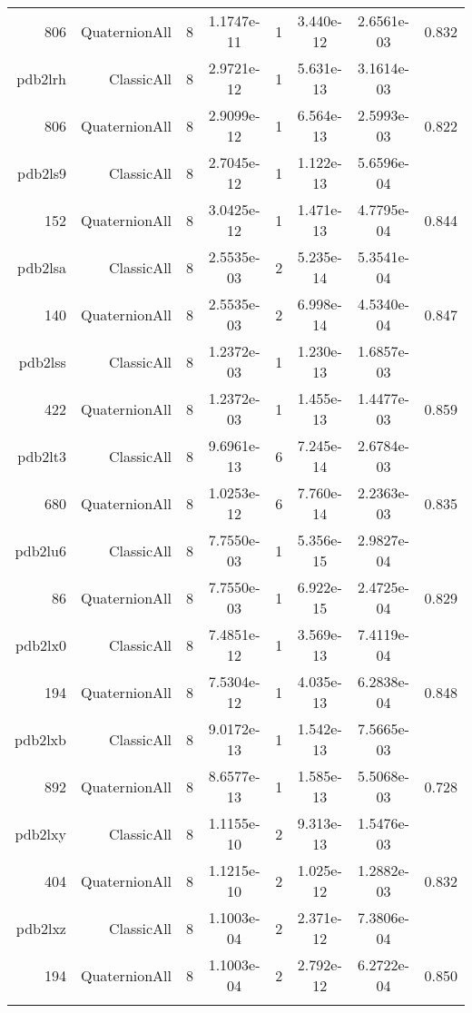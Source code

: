 \begin{xltabular}{\textwidth}{r|rcS[table-format=1.4e+2]cS[table-format=1.3e+2]S[table-format=1.4e+2]S[table-format=-1.3]}
806 & QuaternionAll & 8 & 1.1747e-11 & 1 & 3.440e-12 & 2.6561e-03 & 0.832\\  \addlinespace
pdb2lrh & ClassicAll & 8 & 2.9721e-12 & 1 & 5.631e-13 & 3.1614e-03 & \\
806 & QuaternionAll & 8 & 2.9099e-12 & 1 & 6.564e-13 & 2.5993e-03 & 0.822\\  \addlinespace
pdb2ls9 & ClassicAll & 8 & 2.7045e-12 & 1 & 1.122e-13 & 5.6596e-04 & \\
152 & QuaternionAll & 8 & 3.0425e-12 & 1 & 1.471e-13 & 4.7795e-04 & 0.844\\  \addlinespace
pdb2lsa & ClassicAll & 8 & 2.5535e-03 & 2 & 5.235e-14 & 5.3541e-04 & \\
140 & QuaternionAll & 8 & 2.5535e-03 & 2 & 6.998e-14 & 4.5340e-04 & 0.847\\  \addlinespace
pdb2lss & ClassicAll & 8 & 1.2372e-03 & 1 & 1.230e-13 & 1.6857e-03 & \\
422 & QuaternionAll & 8 & 1.2372e-03 & 1 & 1.455e-13 & 1.4477e-03 & 0.859\\  \addlinespace
pdb2lt3 & ClassicAll & 8 & 9.6961e-13 & 6 & 7.245e-14 & 2.6784e-03 & \\
680 & QuaternionAll & 8 & 1.0253e-12 & 6 & 7.760e-14 & 2.2363e-03 & 0.835\\  \addlinespace
pdb2lu6 & ClassicAll & 8 & 7.7550e-03 & 1 & 5.356e-15 & 2.9827e-04 & \\
86 & QuaternionAll & 8 & 7.7550e-03 & 1 & 6.922e-15 & 2.4725e-04 & 0.829\\  \addlinespace
pdb2lx0 & ClassicAll & 8 & 7.4851e-12 & 1 & 3.569e-13 & 7.4119e-04 & \\
194 & QuaternionAll & 8 & 7.5304e-12 & 1 & 4.035e-13 & 6.2838e-04 & 0.848\\  \addlinespace
pdb2lxb & ClassicAll & 8 & 9.0172e-13 & 1 & 1.542e-13 & 7.5665e-03 & \\
892 & QuaternionAll & 8 & 8.6577e-13 & 1 & 1.585e-13 & 5.5068e-03 & 0.728\\  \addlinespace
pdb2lxy & ClassicAll & 8 & 1.1155e-10 & 2 & 9.313e-13 & 1.5476e-03 & \\
404 & QuaternionAll & 8 & 1.1215e-10 & 2 & 1.025e-12 & 1.2882e-03 & 0.832\\  \addlinespace
pdb2lxz & ClassicAll & 8 & 1.1003e-04 & 2 & 2.371e-12 & 7.3806e-04 & \\
194 & QuaternionAll & 8 & 1.1003e-04 & 2 & 2.792e-12 & 6.2722e-04 & 0.850\\  \addlinespace

\end{xltabular}

